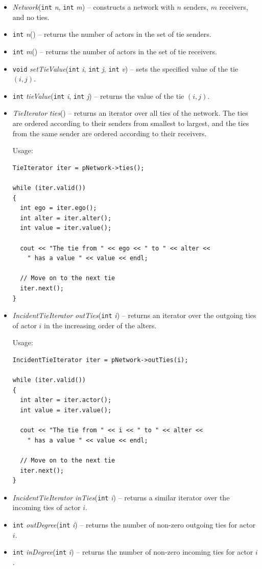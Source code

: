\documentclass[12pt]{article}
\renewcommand{\=}{\,=\,}
\newcommand{\+}{\,+\,}
\newcommand{\nnm}[1]{\textsf{\small\textit{#1}}}
\begin{document}
\begin{itemize}
\item \nnm{Network}(\verb|int| \nnm{n}, \verb|int| \nnm{m}) -- constructs a
network with $n$ senders, $m$ receivers, and no ties.
\item \verb|int| \nnm{n}() -- returns the number of actors in the set of tie
senders.
\item \verb|int| \nnm{m}() -- returns the number of actors in the set of tie
receivers.
\item \verb|void| \nnm{setTieValue}(\verb|int| \nnm{i}, \verb|int| \nnm{j},
\verb|int| \nnm{v}) -- sets the specified value of the tie $(i,j)$.
\item \verb|int| \nnm{tieValue}(\verb|int| \nnm{i}, \verb|int| \nnm{j}) --
returns the value of the tie $(i,j)$.
\item \nnm{TieIterator} \nnm{ties}() -- returns an iterator over all ties of the
network. The ties are ordered according to their senders from smallest to
largest, and the ties from the same sender are ordered according to their
receivers.

Usage:
\begin{verbatim}
TieIterator iter = pNetwork->ties();

while (iter.valid())
{
  int ego = iter.ego();
  int alter = iter.alter();
  int value = iter.value();

  cout << "The tie from " << ego << " to " << alter <<
    " has a value " << value << endl;

  // Move on to the next tie
  iter.next();
}
\end{verbatim}

\item \nnm{IncidentTieIterator} \nnm{outTies}(\verb|int| \nnm{i}) -- returns
an iterator over the outgoing ties of actor $i$ in the increasing order of the
alters.

Usage:
\begin{verbatim}
IncidentTieIterator iter = pNetwork->outTies(i);

while (iter.valid())
{
  int alter = iter.actor();
  int value = iter.value();

  cout << "The tie from " << i << " to " << alter <<
    " has a value " << value << endl;

  // Move on to the next tie
  iter.next();
}
\end{verbatim}

\item \nnm{IncidentTieIterator} \nnm{inTies}(\verb|int| \nnm{i}) -- returns
a similar iterator over the incoming ties of actor $i$.
\item \verb|int| \nnm{outDegree}(\verb|int| \nnm{i}) -- returns the number of
non-zero outgoing ties for actor $i$.
\item \verb|int| \nnm{inDegree}(\verb|int| \nnm{i}) -- returns the number of
non-zero incoming ties for actor $i$.
\end{itemize}
\end{document}
